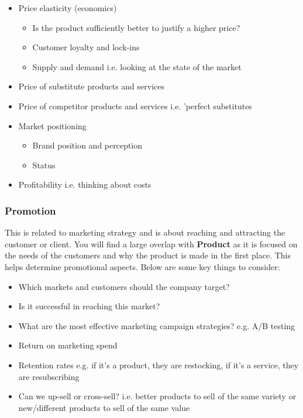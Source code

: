 \documentclass[a4paper]{article}
\begin{document}
{\begin{itemize}
	\item Price elasticity (economics)
		\begin{itemize}
			\item Is the product sufficiently better to justify a higher price?
			\item Customer loyalty and lock-ins
			\item Supply and demand i.e. looking at the state of the market
		\end{itemize}
	\item Price of substitute products and services
	\item Price of competitor products and services i.e. 'perfect substitutes
	\item Market positioning
		\begin{itemize}
			\item Brand position and perception
			\item Status
		\end{itemize}
	\item Profitability i.e. thinking about costs
\end{itemize}

\subsubsection{Promotion}
This is related to marketing strategy and is about reaching and attracting the customer or client. You will find a large overlap with \textbf{Product} as it is focused on the needs of the customers and why the product is made in the first place. This helps determine promotional aspects. Below are some key things to consider:

\begin{itemize}
	\item Which markets and customers should the company target?
	\item Is it successful in reaching this market?
	\item What are the most effective marketing campaign strategies? e.g. A/B testing
	\item Return on marketing spend
	\item Retention rates e.g. if it's a product, they are restocking, if it's a service, they are resubscribing
	\item Can we up-sell or cross-sell? i.e. better products to sell of the same variety or new/different products to sell of the same value
\end{itemize}

}
\end{document}
